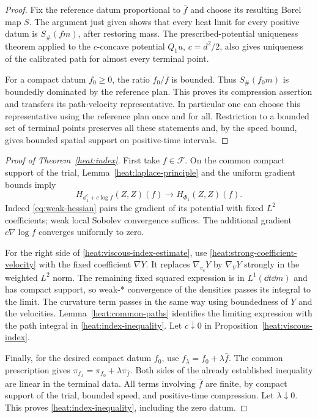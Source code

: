 \begin{proof}
Fix the reference datum proportional to \(\bar f\) and
choose its resulting Borel map \(S\). The argument just
given shows that every heat limit for every positive datum
is \(S_\#(fm)\), after restoring mass. The prescribed-potential
uniqueness theorem \cite[Theorem~1.3]{GigliRajalaSturm2016}
applied to the \(c\)-concave potential \(Q_1u\), \(c=d^2/2\),
also gives uniqueness of the calibrated path for almost every
terminal point.

For a compact datum \(f_0\ge0\), the ratio \(f_0/\bar f\)
is bounded. Thus \(S_\#(f_0m)\) is boundedly dominated by
the reference plan. This proves its compression assertion
and transfers its path-velocity representative. In
particular one can choose this representative using the
reference plan once and for all. Restriction to a bounded
set of terminal points preserves all these statements and,
by the speed bound, gives bounded spatial support on
positive-time intervals.
\end{proof}

\begin{proof}[Proof of Theorem~\ref{heat:index}]
First take \(f\in\mathcal F\). On the common compact
support of the trial, Lemma~\ref{heat:laplace-principle}
and the uniform gradient bounds imply
\[
H_{\phi_1^c+c\log f}(Z,Z)(f)
\longrightarrow H_{\Phi_1}(Z,Z)(f).
\]
Indeed \eqref{eq:weak-hessian} pairs the gradient of its
potential with fixed \(L^2\) coefficients; weak local
Sobolev convergence suffices. The additional gradient
\(c\nabla\log f\) converges uniformly to zero.

For the right side of
\eqref{heat:viscous-index-estimate}, use
\eqref{heat:strong-coefficient-velocity} with the fixed
coefficient \(\nabla Y\). It replaces \(\nabla_{v_c}Y\)
by \(\nabla_VY\) strongly in the weighted \(L^2\) norm.
The remaining fixed squared expression is in \(L^1(\dd t\dd m)\)
and has compact support, so weak-* convergence of the
densities passes its integral to the limit. The curvature
term passes in the same way using boundedness of \(Y\) and
the velocities. Lemma~\ref{heat:common-paths} identifies
the limiting expression with the path integral in
\eqref{heat:index-inequality}. Let \(c\downarrow0\) in
Proposition~\ref{heat:viscous-index}.

Finally, for the desired compact datum \(f_0\), use
\(f_\lambda=f_0+\lambda\bar f\). The common prescription
gives
\(\pi_{f_\lambda}=\pi_{f_0}+\lambda\pi_{\bar f}\).
Both sides of the already established inequality are
linear in the terminal data. All terms involving
\(\bar f\) are finite, by compact support of the trial,
bounded speed, and positive-time compression. Let
\(\lambda\downarrow0\). This proves
\eqref{heat:index-inequality}, including the zero datum.
\end{proof}
